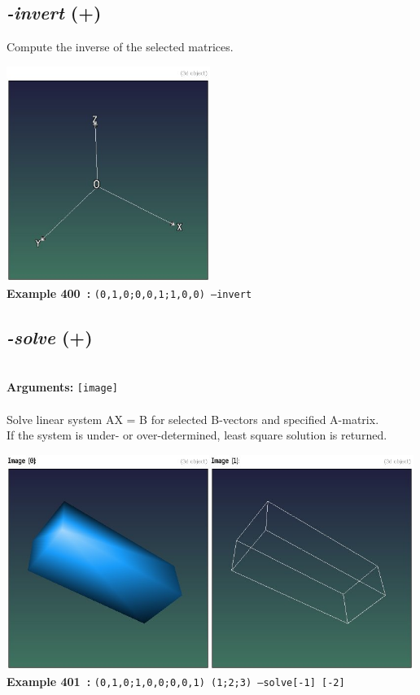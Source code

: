 \documentclass[a4paper,11pt,twoside]{book}
\begin{document}
\subsection{\emph{-invert} (+)}\vspace*{-0.5em}
Compute the inverse of the selected matrices.
\begin{center}\includegraphics[keepaspectratio=true,height=7cm,width=\textwidth]{img/gmic_def400.jpg}\\
{\footnotesize \textbf{Example 400~:} \texttt{(0,1,0;0,0,1;1,0,0) --invert}}
\end{center}

\subsection{\emph{-solve} (+)}\vspace*{-0.5em}
~\\\textbf{Arguments: } 
{\small \texttt{[image]}}\\~\\
Solve linear system AX = B for selected B-vectors and specified A-matrix.
~\\If the system is under- or over-determined, least square solution is returned.
\begin{center}\includegraphics[keepaspectratio=true,height=7cm,width=\textwidth]{img/gmic_def401.jpg}\\
{\footnotesize \textbf{Example 401~:} \texttt{(0,1,0;1,0,0;0,0,1) (1;2;3) --solve[-1] [-2]}}
\end{center}
\end{document}
